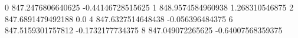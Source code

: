 0 847.2476806640625 -0.44146728515625
1 848.9574584960938 1.268310546875
2 847.6891479492188 0.0
4 847.6327514648438 -0.056396484375
6 847.5159301757812 -0.1732177734375
8 847.049072265625 -0.64007568359375
